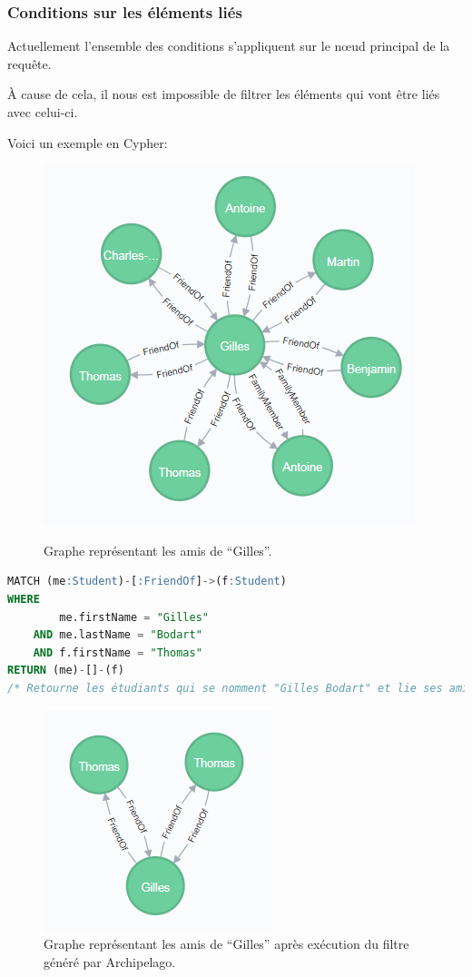 \documentclass[a4paper,fleqn,12pt,oneside]{report}
\begin{document}
\subsubsection*{\bf Conditions sur les éléments liés}

Actuellement l'ensemble des conditions s'appliquent sur le nœud principal de la requête.

\`A cause de cela, il nous est impossible de filtrer les éléments qui vont être liés avec celui-ci. 

Voici un exemple en Cypher:

\begin{figure}[!ht]
\centering
\includegraphics[scale=1]{figures/friendOf.png}
\label{fig:friendOf}
\caption{Graphe représentant les amis de \enquote{Gilles}.}
\end{figure}
 
\begin{lstlisting}[language=SQL]
MATCH (me:Student)-[:FriendOf]->(f:Student)
WHERE
	    me.firstName = "Gilles"
	AND me.lastName = "Bodart"
	AND	f.firstName = "Thomas" 
RETURN (me)-[]-(f)
/* Retourne les étudiants qui se nomment "Gilles Bodart" et lie ses amis qui se prénomment "Thomas" ? */
\end{lstlisting} 

\begin{figure}[!ht]
\centering
\includegraphics[scale=1]{figures/friendOfFilt.png}
\caption{Graphe représentant les amis de \enquote{Gilles} après exécution du filtre généré par Archipelago.}
\label{fig:friendOfFilt}
\end{figure}
\end{document}

